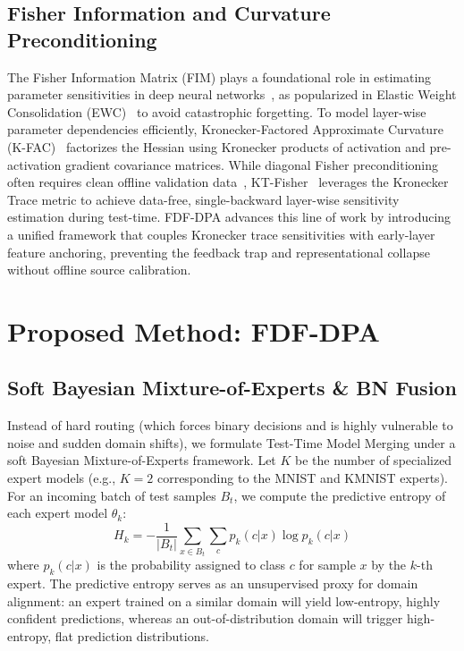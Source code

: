 \documentclass{article}
\theoremstyle{plain}
\theoremstyle{definition}
\theoremstyle{remark}
\begin{document}
\subsection{Fisher Information and Curvature Preconditioning}
The Fisher Information Matrix (FIM) plays a foundational role in estimating parameter sensitivities in deep neural networks~\cite{Jha2025FishersIM, Weimar2025FisherIF}, as popularized in Elastic Weight Consolidation (EWC)~\cite{Yang2021ElasticWC} to avoid catastrophic forgetting. To model layer-wise parameter dependencies efficiently, Kronecker-Factored Approximate Curvature (K-FAC)~\cite{Eschenhagen2023KroneckerFactoredAC, Zhang2023KroneckerfactoredAC} factorizes the Hessian using Kronecker products of activation and pre-activation gradient covariance matrices. While diagonal Fisher preconditioning often requires clean offline validation data~\cite{Gul2024FisherMaskEN}, KT-Fisher~\cite{submission9} leverages the Kronecker Trace metric to achieve data-free, single-backward layer-wise sensitivity estimation during test-time. FDF-DPA advances this line of work by introducing a unified framework that couples Kronecker trace sensitivities with early-layer feature anchoring, preventing the feedback trap and representational collapse without offline source calibration.

\section{Proposed Method: FDF-DPA}
\label{sec:method}

\subsection{Soft Bayesian Mixture-of-Experts \& BN Fusion}
Instead of hard routing (which forces binary decisions and is highly vulnerable to noise and sudden domain shifts), we formulate Test-Time Model Merging under a soft Bayesian Mixture-of-Experts framework. Let $K$ be the number of specialized expert models (e.g., $K=2$ corresponding to the MNIST and KMNIST experts). For an incoming batch of test samples $B_t$, we compute the predictive entropy of each expert model $\theta_k$:
\begin{equation}
H_k = -\frac{1}{|B_t|} \sum_{x \in B_t} \sum_{c} p_k(c|x) \log p_k(c|x)
\end{equation}
where $p_k(c|x)$ is the probability assigned to class $c$ for sample $x$ by the $k$-th expert. The predictive entropy serves as an unsupervised proxy for domain alignment: an expert trained on a similar domain will yield low-entropy, highly confident predictions, whereas an out-of-distribution domain will trigger high-entropy, flat prediction distributions.
\end{document}
